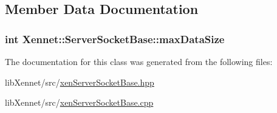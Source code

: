 \subsection{Member Data Documentation}
\hypertarget{classXennet_1_1ServerSocketBase_0d45d6d3353820921a31565c11410e69}{
\subsubsection{\setlength{\rightskip}{0pt plus 5cm}int {\bf Xennet::ServerSocketBase::maxDataSize}}}
\label{classXennet_1_1ServerSocketBase_0d45d6d3353820921a31565c11410e69}




The documentation for this class was generated from the following files:\begin{CompactItemize}
\item 
libXennet/src/\hyperlink{xenServerSocketBase_8hpp}{xenServerSocketBase.hpp}\item 
libXennet/src/\hyperlink{xenServerSocketBase_8cpp}{xenServerSocketBase.cpp}\end{CompactItemize}

